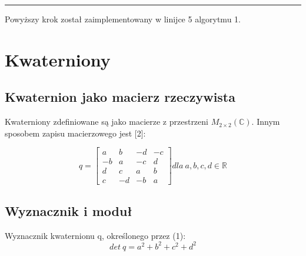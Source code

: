 \documentclass{article}
\begin{document}
\begin{algorithmic}
\ENDIF
{}
\ENDWHILE
\end{algorithmic}
\rule[0.05cm]{\textwidth}{1pt}

Powyższy krok został zaimplementowany w linijce 5 algorytmu 1.

\section{Kwaterniony}
\subsection{Kwaternion jako macierz rzeczywista}
Kwaterniony zdefiniowane są jako macierze z przestrzeni $M_{2\times2} (\mathbb{C}).$ Innym \\
sposobem zapisu macierzowego jest [2]:

$$ \begin{equation}
q= \left[\begin{array}{cccc}
         a & b & -d & -c\\
         -b & a & -c & d\\
         d & c & a & b\\
         c & -d & -b & a
         \end{array}\right] dla\ a,b,c,d \in \mathbb{R}
\end{equation} $$
\subsection{Wyznacznik i moduł}
Wyznacznik kwaternionu q, określonego przez (1):
$$det\ q=a^2+b^2+c^2+d^2$$
\end{document}
